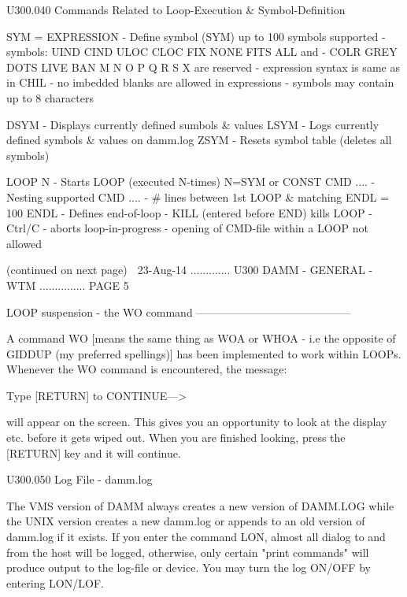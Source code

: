    U300.040  Commands Related to Loop-Execution & Symbol-Definition
 
   SYM = EXPRESSION - Define symbol (SYM) up to 100 symbols supported
                    - symbols: UIND CIND ULOC CLOC FIX NONE FITS ALL and
                    - COLR GREY DOTS LIVE BAN  M N O P Q R S X are reserved
                    - expression syntax is same as in CHIL
                    - no imbedded blanks are allowed in expressions
                    - symbols may contain up to 8 characters
 
   DSYM             - Displays currently defined sumbols & values
   LSYM             - Logs currently defined symbols & values on damm.log
   ZSYM             - Resets symbol table (deletes all symbols)
 
   LOOP N           - Starts LOOP (executed N-times) N=SYM or CONST
   CMD  ....        - Nesting supported
   CMD  ....        - # lines between 1st LOOP & matching ENDL = 100
   ENDL             - Defines end-of-loop
                    - KILL (entered before END) kills LOOP
                    - Ctrl/C    - aborts loop-in-progress
                    - opening of CMD-file within a LOOP not allowed
 
                            (continued on next page)
    
   23-Aug-14 ............. U300  DAMM - GENERAL - WTM ............... PAGE   5
 
   LOOP suspension - the WO command ------------------------------------------
 
   A command WO [means the same thing as WOA or WHOA -  i.e  the  opposite  of
   GIDDUP (my preferred spellings)] has been implemented to work within LOOPs.
   Whenever the WO command is encountered, the message:
 
   Type [RETURN] to CONTINUE--->
 
   will  appear  on  the  screen. This gives you an opportunity to look at the
   display etc. before it gets wiped  out.  When  you  are  finished  looking,
   press the [RETURN] key and it will continue.
 
   U300.050  Log File - damm.log
 
   The  VMS version of DAMM always creates a new version of DAMM.LOG while the
   UNIX version creates a new  damm.log  or  appends  to  an  old  version  of
   damm.log  if  it exists. If you enter the command LON, almost all dialog to
   and from the host will be logged, otherwise, only certain "print  commands"
   will  produce output to the log-file or device. You may turn the log ON/OFF
   by entering LON/LOF.
 
